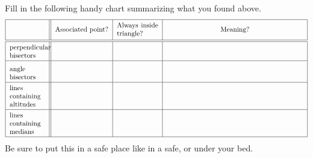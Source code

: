 \documentclass[nooutcomes]{ximera}
\begin{document}
\newpage
\begin{problem}
Fill in the following handy chart summarizing what you found above. 
\[
\begin{tabular}{| l || c | c | c |}
\hline
  & Associated point? & \begin{minipage}{14ex}\minipad Always inside triangle? \minipad\end{minipage} & Meaning? \\ \hline\hline 
\begin{minipage}{12ex}\minipad perpendicular \\ bisectors \minipad\end{minipage}  &\hspace{25mm} &\hspace{15mm}  & \hspace{70mm} \\ \hline
\begin{minipage}{12ex}\minipad angle \\ bisectors \minipad\end{minipage} & \rule[0mm]{0mm}{7mm}    &  & \\ \hline
\begin{minipage}{12ex}\minipad lines \\ containing altitudes \minipad\end{minipage} & \rule[0mm]{0mm}{7mm}    &  &  \\ \hline
\begin{minipage}{12ex}\minipad lines \\ containing medians  \minipad\end{minipage} & \rule[0mm]{0mm}{7mm}   &  &   \\ \hline
\end{tabular}
\]
Be sure to put this in a safe place like in a safe, or under your bed.
\end{problem}
\end{document}
